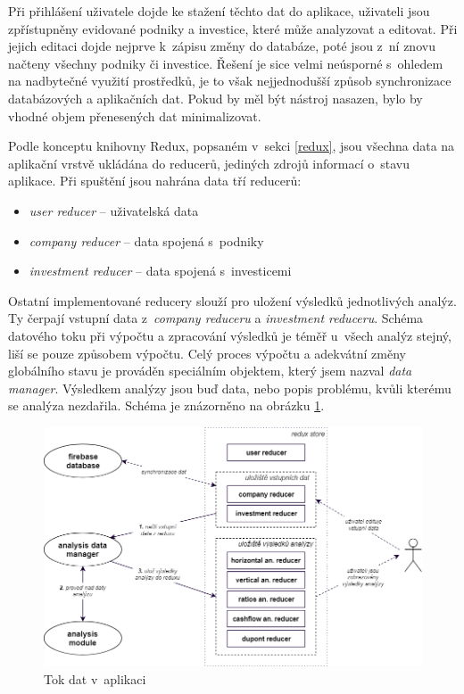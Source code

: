 Při přihlášení uživatele dojde ke stažení těchto dat do aplikace, uživateli jsou zpřístupněny evidované podniky a investice, které může analyzovat a editovat. Při jejich editaci dojde nejprve k~zápisu změny do databáze, poté jsou z~ní znovu načteny všechny podniky či investice. Řešení je sice velmi neúsporné s~ohledem na nadbytečné využití prostředků, je to však nejjednodušší způsob synchronizace databázových a aplikačních dat. Pokud by měl být nástroj nasazen, bylo by vhodné objem přenesených dat minimalizovat. 

Podle konceptu knihovny Redux, popsaném v~sekci \ref{redux}, jsou všechna data na aplikační vrstvě ukládána do reducerů, jediných zdrojů informací o~stavu aplikace. Při spuštění jsou nahrána data tří reducerů:
\begin{itemize}
  \item \textit{user reducer} -- uživatelská data
  \item \textit{company reducer} -- data spojená s~podniky
  \item \textit{investment reducer} -- data spojená s~investicemi
\end{itemize}

Ostatní implementované reducery slouží pro uložení výsledků jednotlivých analýz. Ty čerpají vstupní data z~\textit{company reduceru} a \textit{investment reduceru}. Schéma datového toku při výpočtu a zpracování výsledků je téměř u~všech analýz stejný, liší se pouze způsobem výpočtu. Celý proces výpočtu a adekvátní změny globálního stavu je prováděn speciálním objektem, který jsem nazval \textit{data manager}. Výsledkem analýzy jsou buď data, nebo popis problému, kvůli kterému se analýza nezdařila. Schéma je znázorněno na obrázku \ref{adf}.

\begin{figure}[!htb]
  \centering
  \includegraphics[width=13.5cm]{img/analysis_dataflow.png}
  \caption{Tok dat v~aplikaci}
  \label{adf}
\end{figure}


